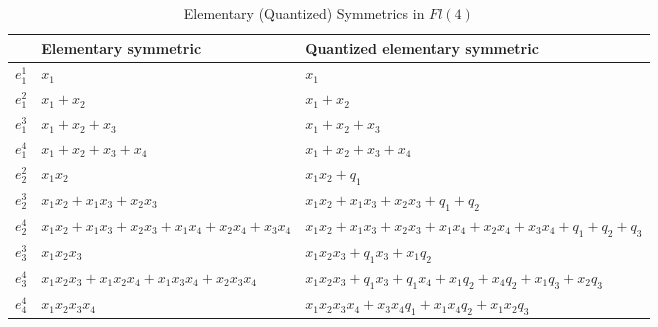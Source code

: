 \documentclass[11pt]{article}
\begin{document}
\newpage 

\begin{table}[!h]
\centering
\caption{Elementary (Quantized) Symmetrics in $Fl(4)$}
\begin{tabular}{|p{1cm}|p{4cm}|p{6cm}|}
\hline
& \textbf{Elementary symmetric} & \textbf{Quantized elementary symmetric} \\ \hline 
$e_1^1$ & $x_1$ & $x_1$ \\ \hline
$e_1^2$ & $x_1 + x_2$ & $x_1 + x_2$ \\ \hline 
$e_1^3$ & $x_1 + x_2 + x_3$ & $x_1 + x_2 + x_3$ \\ \hline 
$e_1^4$ & $x_1 + x_2 + x_3 + x_4$ & $x_1 + x_2 + x_3 + x_4$ \\ \hline 
$e_2^2$ & $x_1x_2$ & $x_1x_2 + q_1$ \\ \hline 
$e_2^3$ & $x_1x_2 + x_1x_3 + x_2x_3$ &  $x_1x_2 + x_1x_3 + x_2x_3 + q_1 + q_2$\\ \hline 
$e_2^4$ & $x_1x_2 + x_1x_3 + x_2x_3 + x_1x_4 + x_2x_4 + x_3x_4$ & $x_1x_2 + x_1x_3 + x_2x_3 + x_1x_4 + x_2x_4 + x_3x_4 + q_1 + q_2 + q_3$ \\ \hline 
$e_3^3$ & $x_1x_2x_3$ & $x_1x_2x_3 + q_1x_3 + x_1q_2$ \\ \hline
$e_3^4$ & $x_1x_2x_3 + x_1x_2x_4 + x_1x_3x_4 + x_2x_3x_4$ & $x_1x_2x_3 + q_1x_3 + q_1x_4 + x_1q_2 + x_4q_2 + x_1q_3 + x_2q_3$ \\ \hline
$e_4^4$ & $x_1x_2x_3x_4$ & $x_1x_2x_3x_4 + x_3x_4q_1 + x_1x_4q_2 + x_1x_2q_3$  \\ \hline
\end{tabular}
\end{table}
\end{document}
